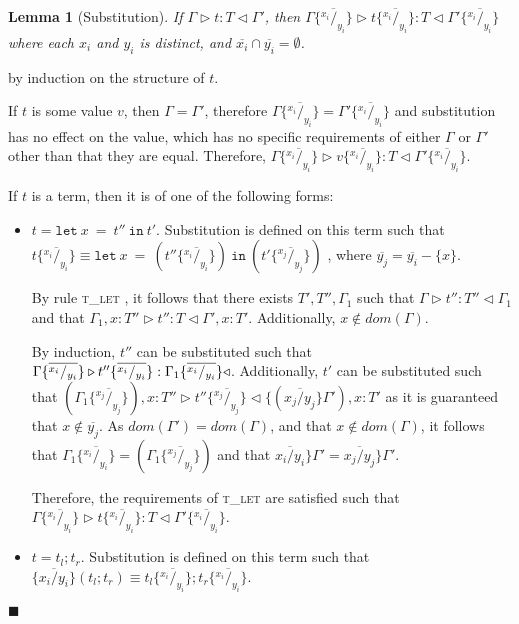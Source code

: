 \documentclass[preprint]{sigplanconf}
\newtheorem{lem}{Lemma}
\newcommand{\tlet}{\textsc{t\_let} }
\newcommand{\typerule}[4]{#1 \triangleright #2 : #3 \triangleleft #4}
\newcommand{\subst}[3]{#3 \{\overline{^{#1}/_{#2}}\}}
\newcommand{\lett}[3]{\mathtt{let}\:#1\:\mathtt{=}\:#2\:\mathtt{in}\:#3}
\newcommand{\qed}{$\blacksquare$}
\newenvironment{proof}{\vspace{1ex}\noindent{\bf Proof}\hspace{0.5em}}
  {\hfill\qed\vspace{1ex}}
\begin{document}
\begin{lem}[Substitution]
\label{lem:subst}
If $\typerule{\Gamma}{t}{T}{\Gamma'}$, then
$\typerule
{\subst{x_i}{y_i}{\Gamma}}
{\subst{x_i}{y_i}{t}}
{T}
{\subst{x_i}{y_i}{\Gamma'}}$
where each $x_i$ and $y_i$ is distinct, and $\overline{x_i} \cap \overline{y_i} = \emptyset$.
\end{lem}
\begin{proof}
by induction on the structure of $t$.

If $t$ is some value $v$, then $\Gamma = \Gamma'$, therefore
$\subst{x_i}{y_i}{\Gamma} = \subst{x_i}{y_i}{\Gamma'}$
and substitution has no effect on the value, which has no specific requirements
of either $\Gamma$ or $\Gamma'$ other than that they are equal.
Therefore, $\typerule{\subst{x_i}{y_i}{\Gamma}}{\subst{x_i}{y_i}{v}}{T}{\subst{x_i}{y_i}{\Gamma'}}$.

If $t$ is a term, then it is of one of the following forms:

\begin{itemize}
\item $t = \lett{x}{t''}{t'}$. 
Substitution is defined on this term such that \\
$\subst{x_i}{y_i}{t} \equiv 
\lett{x}{( \subst{x_i}{y_i}{t''} )}{(\subst{x_j}{y_j}{t'})}$
, where $\overline{y_j} = \overline{y_i} - \{ x \}$.

By rule \tlet, it follows
that there exists $T', T'', \Gamma_1$ such that
$\typerule{\Gamma}{t''}{T''}{\Gamma_1}$ and that
$\typerule{\Gamma_1, x : T''}{t''}{T}{\Gamma', x : T'}$.
Additionally, $x \notin dom(\Gamma)$.

By induction, $t''$ can be substituted such that 
$\typerule
{\subst{x_i}{y_i}{\Gamma}}
{\subst{x_i}{y_i}{t''}}
{\subst{x_i}{y_i}{\Gamma_1}}
$.
Additionally, $t'$ can be substituted such that
$(\subst{x_j}{y_j}{\Gamma_1}) , x : T'' \triangleright \subst{x_j}{y_j}{t''} \triangleleft \{ (\overline{x_j / y_j} \} \Gamma') , x : T'$ as it is guaranteed that $x \notin \overline{y_j}$.
As $dom(\Gamma') = dom(\Gamma)$, and that $x \notin dom(\Gamma)$, it follows that $\subst{x_i}{y_i}{\Gamma_1} = (\subst{x_j}{y_j}{\Gamma_1})$ and
that $\overline{x_i / y_i} \} \Gamma' = \overline{x_j / y_j} \} \Gamma'$.

Therefore, the requirements of \tlet are satisfied such that
$\typerule{\subst{x_i}{y_i}{\Gamma}}{\subst{x_i}{y_i}{t}}{T}{\subst{x_i}{y_i}{\Gamma'}}$.

\item $t = t_l ; t_r$.
Substitution is defined on this term such that
$\{ \overline{x_i / y_i} \} ( t_l ; t_r ) \equiv \subst{x_i}{y_i}{t_l} ; \subst{x_i}{y_i}{t_r}$.


\end{itemize}
\end{proof}
\end{document}

